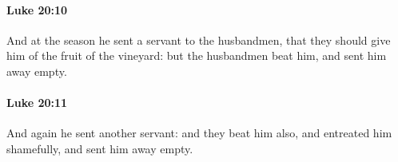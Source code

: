 		\paragraph{Luke 20:10} %
			\label{LUKE-20-10}

			And at the season he sent a servant to the husbandmen, that they should give him of the fruit of the vineyard: but the husbandmen beat him, and sent him away empty.

			\begin{framed}
			\scriptsize
				\begin{compactdesc}
					\item[SBLG] 
				\end{compactdesc}
			\end{framed}

		\paragraph{Luke 20:11} %
			\label{LUKE-20-11}

			And again he sent another servant: and they beat him also, and entreated him shamefully, and sent him away empty.

